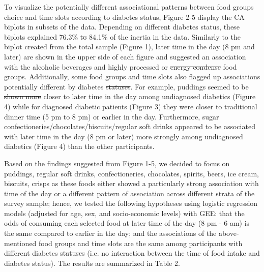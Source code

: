 \documentclass{bmcart}
\providecommand{\DIFadd}[1]{{\protect\color{blue}\uwave{#1}}} %
\providecommand{\DIFdel}[1]{{\protect\color{red}\sout{#1}}}                      %
\providecommand{\DIFaddbegin}{} %
\providecommand{\DIFaddend}{} %
\providecommand{\DIFdelbegin}{} %
\providecommand{\DIFdelend}{} %
\begin{document}
To visualize the potentially different associational patterns between food groups choice and time slots according to diabetes status, Figure 2-5 display the CA biplots in subsets of the data. Depending on different diabetes status, these biplots explained \DIFaddbegin \DIFadd{between }\DIFaddend 76.3\% \DIFdelbegin \DIFdel{to }\DIFdelend \DIFaddbegin \DIFadd{and }\DIFaddend 84.1\% of the inertia in the data. Similarly to the biplot created from the total sample (Figure 1), later time in the day (8 pm and later) are shown in the upper side of each figure and suggested an association with the alcoholic beverages and highly processed or \DIFdelbegin \DIFdel{energy condense }\DIFdelend \DIFaddbegin \DIFadd{energy-dense }\DIFaddend food groups. Additionally, some food groups and time slots also flagged up associations potentially different by diabetes \DIFdelbegin \DIFdel{statuses}\DIFdelend \DIFaddbegin \DIFadd{status}\DIFaddend . For example, puddings seemed to be \DIFdelbegin \DIFdel{shown more }\DIFdelend closer to later time in the day among undiagnosed diabetics (Figure 4) while for diagnosed diabetic patients (Figure 3) they were closer to traditional dinner time (5 pm to 8 pm) or earlier in the day. Furthermore, sugar confectioneries/chocolates/biscuits/regular soft drinks appeared to be associated with later time in the day (8 pm or later) more strongly among undiagnosed diabetics (Figure 4) than the other participants.

Based on the findings suggested from Figure 1-5, we decided to focus on puddings, regular soft drinks, confectioneries, chocolates, spirits, beers, ice cream, biscuits, crisps as these foods either showed a particularly strong association with time of the day or a different pattern of association across different strata of the survey sample; hence, we tested the following \DIFaddbegin \DIFadd{null }\DIFaddend hypotheses using logistic regression models (adjusted for age, sex, and socio-economic levels) with GEE: that the odds of consuming each selected food at later time of the day (8 pm - 6 am) is the same compared to earlier in the day; and the associations of the above-mentioned food groups and time slots are the same among participants with different diabetes \DIFdelbegin \DIFdel{statuses }\DIFdelend \DIFaddbegin \DIFadd{status }\DIFaddend (i.e. no interaction between the time of food intake and diabetes status). The results are summarized in Table 2. 
\end{document}
